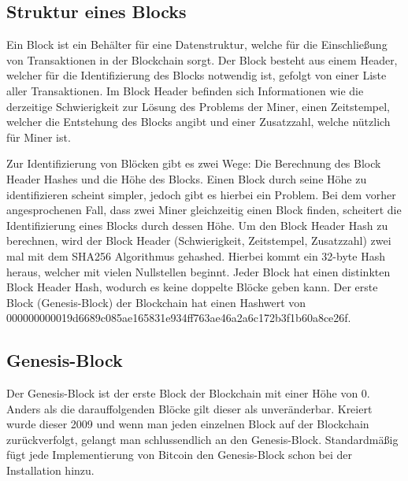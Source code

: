 \subsection{Struktur eines Blocks}
Ein Block ist ein Behälter für eine Datenstruktur, welche für die Einschließung von Transaktionen in der Blockchain sorgt. Der
Block besteht aus einem Header, welcher für die Identifizierung des Blocks notwendig ist, gefolgt von einer Liste aller 
Transaktionen. Im Block Header befinden sich Informationen wie die derzeitige Schwierigkeit zur Lösung des Problems der Miner,
einen Zeitstempel, welcher die Entstehung des Blocks angibt und einer Zusatzzahl, welche nützlich für Miner ist.

Zur Identifizierung von Blöcken gibt es zwei Wege: Die Berechnung des Block Header Hashes und die Höhe des Blocks. Einen Block 
durch seine Höhe zu identifizieren scheint simpler, jedoch gibt es hierbei ein Problem. Bei dem vorher angesprochenen Fall,
dass zwei Miner gleichzeitig einen Block finden, scheitert die Identifizierung eines Blocks durch dessen Höhe. Um den Block
Header Hash zu berechnen, wird der Block Header (Schwierigkeit, Zeitstempel, Zusatzzahl) zwei mal mit dem SHA256 Algorithmus 
gehashed. Hierbei kommt ein 32-byte Hash heraus, welcher mit vielen Nullstellen beginnt. Jeder Block hat einen distinkten Block
Header Hash, wodurch es keine doppelte Blöcke geben kann. Der erste Block (Genesis-Block) der Blockchain hat einen Hashwert von
000000000019d6689c085ae165831e934ff763ae46a2a6c172b3f1b60a8ce26f.


\subsection{Genesis-Block}
Der Genesis-Block ist der erste Block der Blockchain mit einer Höhe von 0. Anders als die darauffolgenden Blöcke gilt dieser als
unveränderbar. Kreiert wurde dieser 2009 und wenn man jeden einzelnen Block auf der Blockchain zurückverfolgt, gelangt man
schlussendlich an den Genesis-Block. Standardmäßig fügt jede Implementierung von Bitcoin den Genesis-Block schon bei der 
Installation hinzu.